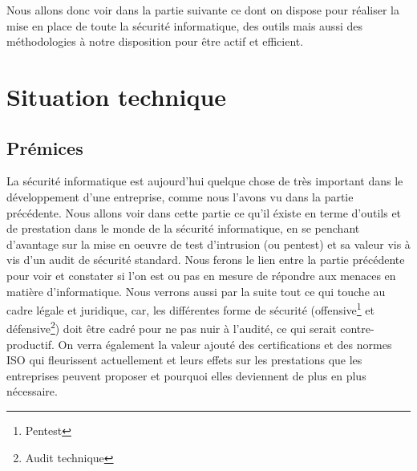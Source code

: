 \documentclass[a4paper]{memoir}
\begin{document}
Nous allons donc voir dans la partie suivante ce dont on dispose pour réaliser la mise en place de toute la sécurité informatique, des outils mais aussi des méthodologies à notre disposition pour être actif et efficient.

\part{Situation technique}

\chapter{Prémices}

La sécurité informatique est aujourd'hui quelque chose de très important dans le développement d'une entreprise, comme nous l'avons vu dans la partie précédente. Nous allons voir dans cette partie ce qu'il éxiste en terme d'outils et de prestation dans le monde de la sécurité informatique, en se penchant d'avantage sur la mise en oeuvre de test d'intrusion (ou pentest) et sa valeur vis à vis d'un audit de sécurité standard. Nous ferons le lien entre la partie précédente pour voir et constater si l'on est ou pas en mesure de répondre aux menaces en matière d'informatique. Nous verrons aussi par la suite tout ce qui touche au cadre légale et juridique, car, les différentes forme de sécurité (offensive\footnote{Pentest} et défensive\footnote{Audit technique}) doit être cadré pour ne pas nuir à l'audité, ce qui serait contre-productif. On verra également la valeur ajouté des certifications et des normes ISO qui fleurissent actuellement et leurs effets sur les prestations que les entreprises peuvent proposer et pourquoi elles deviennent de plus en plus nécessaire.\\ 
\end{document}
